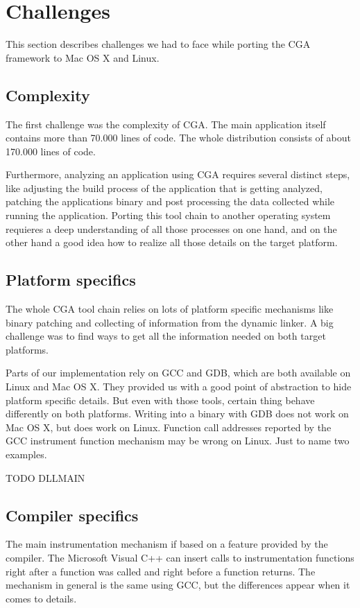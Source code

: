 \section{Challenges} This section describes challenges we had to face while porting the CGA framework to Mac OS X and Linux.

\subsection{Complexity} The first challenge was the complexity of CGA. The main application itself contains more than 70.000 lines of code. The whole distribution consists of about 170.000 lines of code. 

Furthermore, analyzing an application using CGA requires several distinct steps, like adjusting the build process of the application that is getting analyzed, patching the applications binary and post processing the data collected while running the application. Porting this tool chain to another operating system requieres a deep understanding of all those processes on one hand, and on the other hand a good idea how to realize all those details on the target platform.

\subsection{Platform specifics} The whole CGA tool chain relies on lots of platform specific mechanisms like binary patching and collecting of information from the dynamic linker. A big challenge was to find ways to get all the information needed on both target platforms. 

Parts of our implementation rely on GCC and GDB, which are both available on Linux and Mac OS X. They provided us with a good point of abstraction to hide platform specific details. But even with those tools, certain thing behave differently on both platforms. Writing into a binary with GDB does not work on Mac OS X, but does work on Linux. Function call addresses reported by the GCC instrument function mechanism may be wrong on Linux. Just to name two examples. 

TODO DLLMAIN

\subsection{Compiler specifics} The main instrumentation mechanism if based on a feature provided by the compiler. The Microsoft Visual C++ can insert calls to instrumentation functions right after a function was called and right before a function returns. The mechanism in general is the same using GCC, but the differences appear when it comes to details. 

